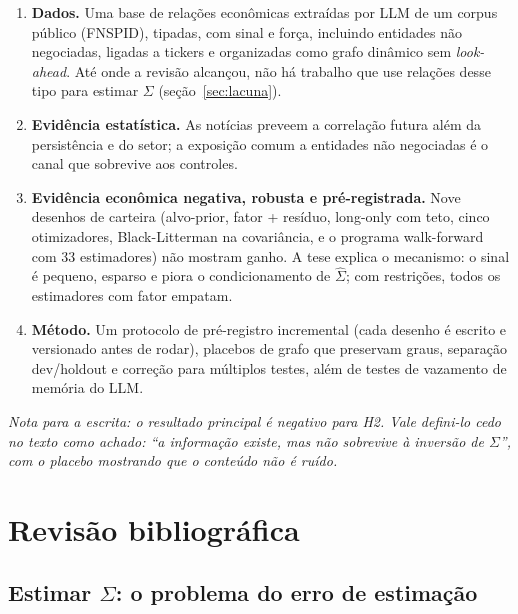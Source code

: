 \documentclass[11pt,a4paper]{article}
\newcommand{\Sig}{\hat\Sigma}
\newcommand{\nota}[1]{\textcolor{blue!60!black}{\textit{Nota para a escrita: #1}}}
\begin{document}
\begin{enumerate}
  \item \textbf{Dados.} Uma base de relações econômicas extraídas por LLM de um corpus público
        (FNSPID), tipadas, com sinal e força, incluindo entidades não negociadas, ligadas a tickers e
        organizadas como grafo dinâmico sem \emph{look-ahead}. Até onde a revisão alcançou, não há
        trabalho que use relações desse tipo para estimar $\Sigma$ (seção~\ref{sec:lacuna}).
  \item \textbf{Evidência estatística.} As notícias preveem a correlação futura além da persistência e do
        setor; a exposição comum a entidades não negociadas é o canal que sobrevive aos controles.
  \item \textbf{Evidência econômica negativa, robusta e pré-registrada.} Nove desenhos de carteira
        (alvo-prior, fator + resíduo, long-only com teto, cinco otimizadores, Black-Litterman na
        covariância, e o programa walk-forward com 33 estimadores) não mostram ganho. A tese explica o
        mecanismo: o sinal é pequeno, esparso e piora o condicionamento de $\Sig$; com restrições,
        todos os estimadores com fator empatam.
  \item \textbf{Método.} Um protocolo de pré-registro incremental (cada desenho é escrito e versionado
        antes de rodar), placebos de grafo que preservam graus, separação dev/holdout e correção para
        múltiplos testes, além de testes de vazamento de memória do LLM.
\end{enumerate}

\nota{o resultado principal é negativo para H2. Vale defini-lo cedo no texto como achado: ``a
informação existe, mas não sobrevive à inversão de $\Sigma$'', com o placebo mostrando que o
conteúdo não é ruído.}

\section{Revisão bibliográfica}\label{sec:revisao}

\subsection{Estimar $\Sigma$: o problema do erro de estimação}
\end{document}
